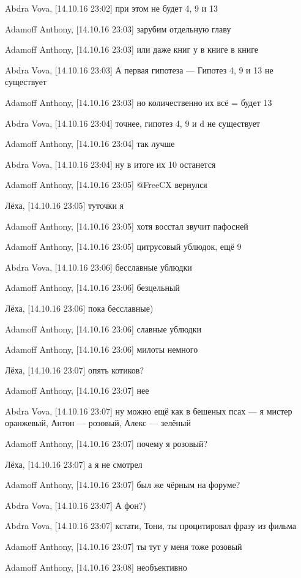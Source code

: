 Abdra Vova, [14.10.16 23:02]
при этом не будет 4, 9 и 13

Adamoff Anthony, [14.10.16 23:03]
зарубим отдельную главу

Adamoff Anthony, [14.10.16 23:03]
или даже книг у в книге в книге

Abdra Vova, [14.10.16 23:03]
А первая гипотеза — Гипотез 4, 9 и 13 не существует

Adamoff Anthony, [14.10.16 23:03]
но количественно их всё = будет 13

Abdra Vova, [14.10.16 23:04]
точнее, гипотез 4, 9  и d не существует

Adamoff Anthony, [14.10.16 23:04]
так лучше

Abdra Vova, [14.10.16 23:04]
ну в итоге их 10 останется

Adamoff Anthony, [14.10.16 23:05]
@FreeCX вернулся

Лёха, [14.10.16 23:05]
туточки я

Adamoff Anthony, [14.10.16 23:05]
хотя восстал звучит пафосней

Adamoff Anthony, [14.10.16 23:05]
цитрусовый ублюдок, ещё 9

Abdra Vova, [14.10.16 23:06]
бесславные ублюдки

Adamoff Anthony, [14.10.16 23:06]
безцельный

Лёха, [14.10.16 23:06]
пока бесславные)

Adamoff Anthony, [14.10.16 23:06]
славные ублюдки

Adamoff Anthony, [14.10.16 23:06]
милоты немного

Лёха, [14.10.16 23:07]
опять котиков?

Adamoff Anthony, [14.10.16 23:07]
нее

Abdra Vova, [14.10.16 23:07]
ну можно ещё как в бешеных псах — я мистер оранжевый, Антон — розовый, Алекс — зелёный

Adamoff Anthony, [14.10.16 23:07]
почему я розовый?

Лёха, [14.10.16 23:07]
а я не смотрел

Adamoff Anthony, [14.10.16 23:07]
был же чёрным на форуме?

Abdra Vova, [14.10.16 23:07]
А фон?)

Abdra Vova, [14.10.16 23:07]
кстати, Тони, ты процитировал фразу из фильма

Adamoff Anthony, [14.10.16 23:07]
ты тут у меня тоже розовый

Adamoff Anthony, [14.10.16 23:08]
необъективно

